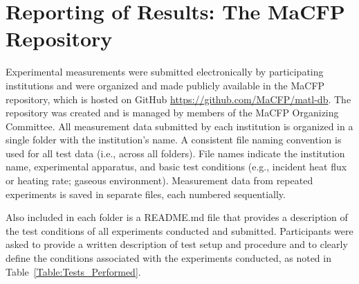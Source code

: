 \documentclass{book}
\begin{document}
\newpage
\section{Reporting of Results: The MaCFP Repository}

Experimental measurements were submitted electronically by participating institutions and were organized and made publicly available in the MaCFP repository, which is hosted on GitHub \href{https://github.com/MaCFP/matl-db}{https://github.com/MaCFP/matl-db}. The repository was created and is managed by members of the MaCFP Organizing Committee. All measurement data submitted by each institution is organized in a single folder with the institution’s name. A consistent file naming convention is used for all test data (i.e., across all folders). File names indicate the institution name, experimental apparatus, and basic test conditions (e.g., incident heat flux or heating rate; gaseous environment). Measurement data from repeated experiments is saved in separate files, each numbered sequentially.

Also included in each folder is a README.md file that provides a description of the test conditions of all experiments conducted and submitted. Participants were asked to provide a written description of test setup and procedure and to clearly define the conditions associated with the experiments conducted, as noted in Table~\ref{Table:Tests_Performed}.
\end{document}
